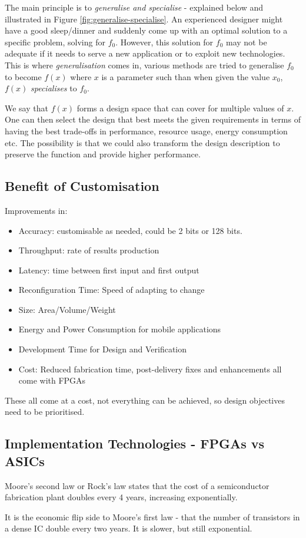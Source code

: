 \documentclass[a4paper]{scrartcl}
\begin{document}
The main principle is to \emph{generalise and specialise} - explained below and 
illustrated in Figure \ref{fig:generalise-specialise}. An experienced designer might 
have a good sleep/dinner and suddenly come up with an optimal solution to a specific problem,
solving for $f_0$. However, this solution for $f_0$ may not be adequate if it needs to 
serve a new application or to exploit new technologies.  This is where \emph{generalisation}
comes in, various methods are tried to generalise $f_0$ to become $f(x)$ where $x$ is a
parameter such than when given the value $x_0$, $f(x)$ \emph{specialises} to $f_0$. 

We say that $f(x)$ forms a design space that can cover for multiple values of $x$. 
One can then select the design that best meets the given requirements in terms of
having the best trade-offs in performance, resource usage, energy consumption etc.
The possibility is that we could also transform the design description to preserve the 
function and provide higher performance. 

\subsection{Benefit of Customisation}
Improvements in:
\begin{itemize}
    \item Accuracy: customisable as needed, could be 2 bits or 128 bits. 
    \item Throughput: rate of results production
    \item Latency: time between first input and first output
    \item Reconfiguration Time: Speed of adapting to change
    \item Size: Area/Volume/Weight
    \item Energy and Power Consumption for mobile applications
    \item Development Time for Design and Verification
    \item Cost: Reduced fabrication time, post-delivery fixes and enhancements all come with FPGAs
\end{itemize}

These all come at a cost, not everything can be achieved, so design objectives 
need to be prioritised. 

\subsection{Implementation Technologies - FPGAs vs ASICs}
\begin{theorem}
    Moore's second law or Rock's law states that the cost of a semiconductor fabrication
    plant doubles every 4 years, increasing exponentially. 

    It is the economic flip side to Moore's first law - that the number of transistors
    in a dense IC double every two years. It is slower, but still exponential. 
    \label{thm:moores-law2}
\end{theorem}
\end{document}
